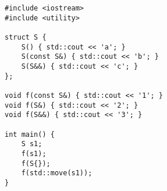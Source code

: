 \begin{lstlisting}[title=\href{https://godbolt.org/z/yB5zTx}{\texttt{godbolt.org/z/yB5zTx}}]
#include <iostream>
#include <utility>

struct S {
    S() { std::cout << 'a'; }
    S(const S&) { std::cout << 'b'; }
    S(S&&) { std::cout << 'c'; }
};

void f(const S&) { std::cout << '1'; }
void f(S&) { std::cout << '2'; }
void f(S&&) { std::cout << '3'; }

int main() {
    S s1;
    f(s1);
    f(S{});
    f(std::move(s1));
}
\end{lstlisting}

